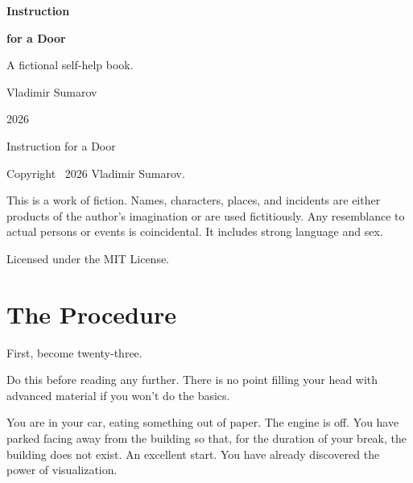 \documentclass[11pt,oneside]{book}
\begin{document}
\color{ink}

\begin{titlepage}
\thispagestyle{empty}
\vspace*{0.32\textheight}
{\sffamily\bfseries\fontsize{36}{40}\selectfont Instruction\par}
\vspace{0.15em}
{\sffamily\bfseries\fontsize{36}{40}\selectfont for a Door\par}
\vspace{1.05em}
{\large
A fictional self-help book.\par}
\vfill
{\sffamily Vladimir Sumarov\par}
\vspace{0.35em}
{\sffamily\footnotesize\color{quiet} 2026\par}
\vspace{1.4em}
\end{titlepage}

\clearpage
\thispagestyle{empty}
\vspace*{\fill}
{\sffamily\footnotesize\color{quiet} Instruction for a Door\par}
\vspace{0.75em}
{\footnotesize
Copyright \textcopyright\ 2026 Vladimir Sumarov.\par}
\vspace{0.65em}
{\footnotesize
This is a work of fiction. Names, characters, places, and incidents
are either products of the author's imagination or are used
fictitiously. Any resemblance to actual persons or events is
coincidental. It includes strong language and sex.\par}
\vspace{0.65em}
{\footnotesize
Licensed under the MIT License.\par}
\vspace*{\fill}
\clearpage

\tableofcontents
\clearpage

\chapter*{The Procedure}

First, become twenty-three.

Do this before reading any further. There is no point filling your head with advanced material if you won't do the basics.

You are in your car, eating something out of paper. The engine is off. You have parked facing away from the building so that, for the duration of your break, the building does not exist. An excellent start. You have already discovered the power of visualization.
\end{document}

